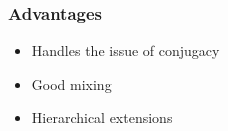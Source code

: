 \documentclass{beamer}
\begin{document}
\begin{frame} %
	\frametitle{Advantages}

	\begin{itemize}
	     \item Handles the issue of conjugacy

	    \item Good mixing %

	    \item Hierarchical extensions
	\end{itemize}

\end{frame}
\end{document}
